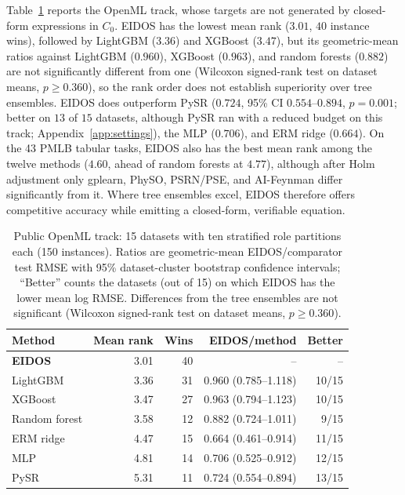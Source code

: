 Table~\ref{tab:realtrack} reports the OpenML track, whose targets are not generated by closed-form expressions in \(C_0\). EIDOS has the lowest mean rank (\(3.01\), \(40\) instance wins), followed by LightGBM (\(3.36\)) and XGBoost (\(3.47\)), but its geometric-mean ratios against LightGBM (\(0.960\)), XGBoost (\(0.963\)), and random forests (\(0.882\)) are not significantly different from one (Wilcoxon signed-rank test on dataset means, \(p\ge0.360\)), so the rank order does not establish superiority over tree ensembles. EIDOS does outperform PySR (\(0.724\), 95\% CI \(0.554\)--\(0.894\), \(p=0.001\); better on \(13\) of \(15\) datasets, although PySR ran with a reduced budget on this track; Appendix~\ref{app:settings}), the MLP (\(0.706\)), and ERM ridge (\(0.664\)). On the 43 PMLB tabular tasks, EIDOS also has the best mean rank among the twelve methods (\(4.60\), ahead of random forests at \(4.77\)), although after Holm adjustment only gplearn, PhySO, PSRN/PSE, and AI-Feynman differ significantly from it. Where tree ensembles excel, EIDOS therefore offers competitive accuracy while emitting a closed-form, verifiable equation.

\begin{table}[t]
\def\baselinestretch{1}\selectfont
\caption{Public OpenML track: 15 datasets with ten stratified role partitions each (150 instances). Ratios are geometric-mean EIDOS/comparator test RMSE with 95\% dataset-cluster bootstrap confidence intervals; ``Better'' counts the datasets (out of 15) on which EIDOS has the lower mean log RMSE. Differences from the tree ensembles are not significant (Wilcoxon signed-rank test on dataset means, \(p\ge0.360\)).}\label{tab:realtrack}
\centering
\scriptsize
\setlength{\tabcolsep}{3.0pt}
\begin{tabular}{@{}lrrrr@{}}
\toprule
\textbf{Method} & \textbf{Mean rank} & \textbf{Wins} & \textbf{EIDOS/method} & \textbf{Better} \\
\midrule
\textbf{EIDOS} & 3.01 & 40 & -- & -- \\
LightGBM & 3.36 & 31 & 0.960 (0.785--1.118) & 10/15 \\
XGBoost & 3.47 & 27 & 0.963 (0.794--1.123) & 10/15 \\
Random forest & 3.58 & 12 & 0.882 (0.724--1.011) & 9/15 \\
ERM ridge & 4.47 & 15 & 0.664 (0.461--0.914) & 11/15 \\
MLP & 4.81 & 14 & 0.706 (0.525--0.912) & 12/15 \\
PySR & 5.31 & 11 & 0.724 (0.554--0.894) & 13/15 \\
\bottomrule
\end{tabular}
\end{table}

